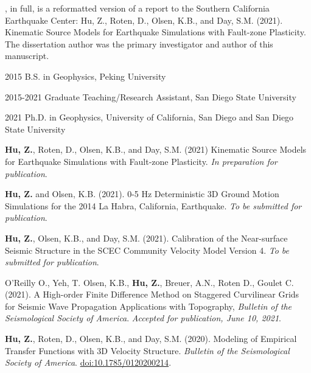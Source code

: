 \begin{frontmatter}
\begin{acknowledgements}
        , in full, is a reformatted version of a report to the Southern California Earthquake Center: Hu, Z., Roten, D., Olsen, K.B., and Day, S.M. (2021). Kinematic Source Models for Earthquake Simulations with Fault-zone Plasticity. The dissertation author was the primary investigator and author of this manuscript.
        

    \end{acknowledgements}


    \begin{vitapage}
        \begin{vita}
            \item[2015] B.S. in Geophysics, Peking University
            \item[2015-2021] Graduate Teaching/Research Assistant, San Diego State University
            \item[2021] Ph.D. in Geophysics, University of California, San Diego and San Diego State University
        \end{vita}
        \begin{publications}
            \item \textbf{Hu, Z.}, Roten, D., Olsen, K.B., and Day, S.M. (2021) Kinematic Source Models for Earthquake Simulations with Fault-zone Plasticity. \emph{In preparation for publication}.
            \item \textbf{Hu, Z.} and Olsen, K.B. (2021). 0-5 Hz Deterministic 3D Ground Motion Simulations for the 2014 La Habra, California, Earthquake. \emph{To be submitted for publication}.
            \item \textbf{Hu, Z.}, Olsen, K.B., and Day, S.M. (2021). Calibration of the Near-surface Seismic Structure in the SCEC Community Velocity Model Version 4. \emph{To be submitted for publication}.
            \item O'Reilly O., Yeh, T. Olsen, K.B., \textbf{Hu, Z.}, Breuer, A.N., Roten D., Goulet C. (2021). A High-order Finite Difference Method on Staggered Curvilinear Grids for Seismic Wave Propagation Applications with Topography, \emph{Bulletin of the Seismological Society of America}. \emph{Accepted for publication, June 10, 2021}.
            \item \textbf{Hu, Z.}, Roten, D., Olsen, K.B., and Day, S.M. (2020). Modeling of Empirical Transfer Functions with 3D Velocity Structure. \emph{Bulletin of the Seismological Society of America}. \url{doi:10.1785/0120200214}.



\end{publications}
\end{vitapage}
\end{frontmatter}
